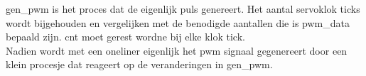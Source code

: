 
gen\_pwm is het proces dat de eigenlijk puls genereert. Het aantal servoklok ticks wordt bijgehouden en vergelijken met de benodigde aantallen die is pwm\_data bepaald zijn. cnt moet gerest wordne bij elke klok tick.\\
Nadien wordt met een oneliner eigenlijk het pwm signaal gegenereert door een klein procesje dat reageert op de veranderingen in gen\_pwm.

